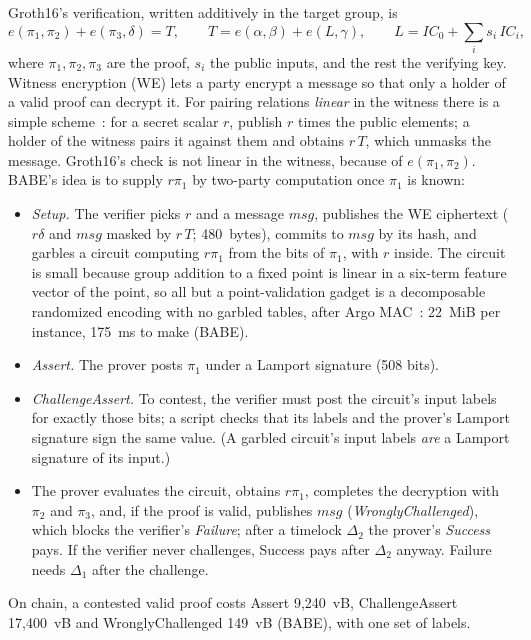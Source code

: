 \documentclass[11pt]{article}
\begin{document}
Groth16's verification, written additively in the target group, is
\[
  e(\pi_1, \pi_2) + e(\pi_3, \delta) = T, \qquad
  T = e(\alpha, \beta) + e(L, \gamma), \qquad
  L = \mathit{IC}_0 + \textstyle\sum_i s_i\, \mathit{IC}_i,
\]
where $\pi_1, \pi_2, \pi_3$ are the proof, $s_i$ the public inputs, and
the rest the verifying key. Witness encryption (WE) lets a party encrypt
a message so that only a holder of a valid proof can decrypt it. For
pairing relations \emph{linear} in the witness there is a simple
scheme~\cite{gkpw24}: for a secret scalar $r$, publish $r$ times the
public elements; a holder of the witness pairs it against them and
obtains $r\,T$, which unmasks the message. Groth16's check is not linear
in the witness, because of $e(\pi_1, \pi_2)$. BABE's idea is to supply
$r\pi_1$ by two-party computation once $\pi_1$ is known:
\begin{itemize}[leftmargin=1.5em]
\item \emph{Setup.} The verifier picks $r$ and a message $\mathit{msg}$,
  publishes the WE ciphertext ($r\delta$ and $\mathit{msg}$ masked by
  $r\,T$; 480~bytes), commits to $\mathit{msg}$ by its hash, and
  garbles a circuit computing $r\pi_1$ from the bits of $\pi_1$, with $r$
  inside. The circuit is small because group addition to a fixed point
  is linear in a six-term feature vector of the point, so all but a
  point-validation gadget is a decomposable randomized encoding with no
  garbled tables, after Argo MAC~\cite{argo}: 22~MiB per instance, 175~ms
  to make (BABE).
\item \emph{Assert.} The prover posts $\pi_1$ under a Lamport signature
  (508 bits).
\item \emph{ChallengeAssert.} To contest, the verifier must post the
  circuit's input labels for exactly those bits; a script checks that
  its labels and the prover's Lamport signature sign the same value. (A
  garbled circuit's input labels \emph{are} a Lamport signature of its
  input.)
\item The prover evaluates the circuit, obtains $r\pi_1$, completes the
  decryption with $\pi_2$ and $\pi_3$, and, if the proof is valid,
  publishes $\mathit{msg}$ (\emph{WronglyChallenged}), which blocks the
  verifier's \emph{Failure}; after a timelock $\Delta_2$ the prover's
  \emph{Success} pays. If the verifier never challenges, Success pays
  after $\Delta_2$ anyway. Failure needs $\Delta_1$ after the challenge.
\end{itemize}
On chain, a contested valid proof costs Assert 9,240~vB, ChallengeAssert
17,400~vB and WronglyChallenged 149~vB (BABE), with one set of labels.
\end{document}
